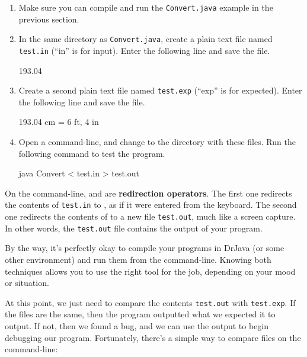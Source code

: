 \begin{enumerate}

\item Make sure you can compile and run the {\tt Convert.java} example in the previous section.

\item In the same directory as {\tt Convert.java}, create a plain text file named {\tt test.in} (``in'' is for input).
Enter the following line and save the file.

\begin{stdout}
193.04
\end{stdout}

\item Create a second plain text file named {\tt test.exp} (``exp'' is for expected).
Enter the following line and save the file.

\begin{stdout}
193.04 cm = 6 ft, 4 in
\end{stdout}

\item Open a command-line, and change to the directory with these files.
Run the following command to test the program.

\begin{stdout}
java Convert < test.in > test.out
\end{stdout}

\end{enumerate}

On the command-line, \java{<} and \java{>} are {\bf redirection operators}.
The first one redirects the contents of {\tt test.in} to , as if it were entered from the keyboard.
The second one redirects the contents of  to a new file {\tt test.out}, much like a screen capture.
In other words, the {\tt test.out} file contains the output of your program.

By the way, it's perfectly okay to compile your programs in DrJava (or some other environment) and run them from the command-line.
Knowing both techniques allows you to use the right tool for the job, depending on your mood or situation.

At this point, we just need to compare the contents {\tt test.out} with {\tt test.exp}.
If the files are the same, then the program outputted what we expected it to output.
If not, then we found a bug, and we can use the output to begin debugging our program.
Fortunately, there's a simple way to compare files on the command-line:


